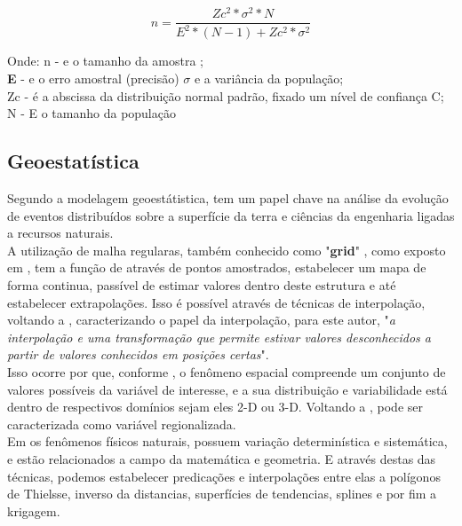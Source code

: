 	\begin{minipage}[t!]{0.35\textwidth}
		\begin{equation}\label{eq:namostra}
			n = \dfrac{ Zc ^{2}*\sigma ^{2} *N  }{ E ^{2} * (N-1) + Zc ^{2} * \sigma ^{2}}
			\end{equation}
		\end{minipage}\hfill
		\begin{minipage}[t!]{0.6085\textwidth}
			Onde: 
			n -  e o tamanho da amostra ;\\
			\textbf{E} -  e o erro amostral (precisão)
			$ \sigma $ e a variância da população;\\
			Zc  -  é a abscissa da distribuição normal padrão, fixado um nível de confiança  C;\\
			N  - E o tamanho da população
		\end{minipage} 
		
 
		\subsection{Geoestatística} 
		
		\hspace*{1.25 cm} Segundo \cite[p.1]{delgado}  a modelagem geoestátistica, tem um papel chave na análise da evolução de eventos distribuídos sobre a superfície da terra e ciências da engenharia ligadas a recursos naturais. \\
		\hspace*{1.25 cm} A  utilização de malha regularas, também conhecido como "\textbf{grid}" , como exposto em \cite[p.83]{Andriotti}, tem a função de através de pontos amostrados, estabelecer um mapa de forma continua, passível de estimar valores dentro deste estrutura e até estabelecer extrapolações. Isso é possível através de técnicas de interpolação, voltando a \cite[p.304]{Ariza},  caracterizando o papel da interpolação, para este autor, "\textit{a interpolação e uma transformação que permite estivar valores desconhecidos a partir de valores conhecidos em posições certas}". \\
		\hspace*{1.25 cm} Isso ocorre por que, conforme \cite[p.21]{Yamamoto}, o fenômeno espacial compreende um conjunto de valores possíveis da variável de interesse, e a sua distribuição e variabilidade está dentro de respectivos domínios sejam eles 2-D ou 3-D.  Voltando a  \cite[p.95]{Andriotti}, pode ser caracterizada como variável regionalizada.\\
		\hspace*{1.25 cm}  Em  \cite[p.37]{Webster} os fenômenos físicos naturais, possuem variação determinística e sistemática, e estão relacionados a campo da matemática e geometria. E através destas das técnicas, podemos estabelecer predicações e interpolações entre elas a polígonos de Thielsse, inverso da distancias, superfícies de tendencias, splines e por fim a krigagem.   
